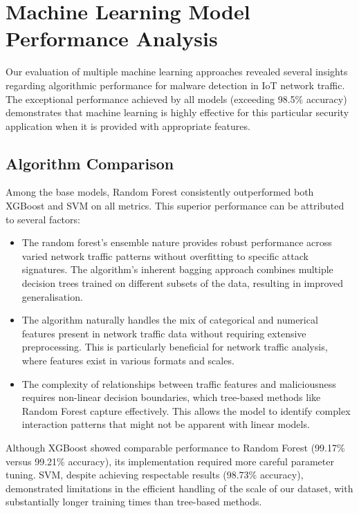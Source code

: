 \section{Machine Learning Model Performance Analysis}

Our evaluation of multiple machine learning approaches revealed several insights regarding algorithmic performance for malware detection in IoT network traffic. The exceptional performance achieved by all models (exceeding 98.5\% accuracy) demonstrates that machine learning is highly effective for this particular security application when it is provided with appropriate features.

\subsection{Algorithm Comparison}

Among the base models, Random Forest consistently outperformed both XGBoost and SVM on all metrics. This superior performance can be attributed to several factors:

\begin{itemize}
    \item The random forest's ensemble nature provides robust performance across varied network traffic patterns without overfitting to specific attack signatures. The algorithm's inherent bagging approach combines multiple decision trees trained on different subsets of the data, resulting in improved generalisation.
    
    \item The algorithm naturally handles the mix of categorical and numerical features present in network traffic data without requiring extensive preprocessing. This is particularly beneficial for network traffic analysis, where features exist in various formats and scales.
    
    \item  The complexity of relationships between traffic features and maliciousness requires non-linear decision boundaries, which tree-based methods like Random Forest capture effectively. This allows the model to identify complex interaction patterns that might not be apparent with linear models.
\end{itemize}

Although XGBoost showed comparable performance to Random Forest (99.17\% versus 99.21\% accuracy), its implementation required more careful parameter tuning. SVM, despite achieving respectable results (98.73\% accuracy), demonstrated limitations in the efficient handling of the scale of our dataset, with substantially longer training times than tree-based methods.

